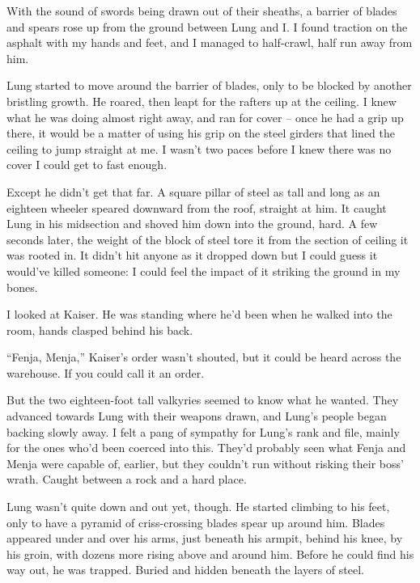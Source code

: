 With the sound of swords being drawn out of their sheaths, a barrier of blades and spears rose up from the ground between Lung and I.  I found traction on the asphalt with my hands and feet, and I managed to half-crawl, half run away from him.



Lung started to move around the barrier of blades, only to be blocked by another bristling growth.  He roared, then leapt for the rafters up at the ceiling.  I knew what he was doing almost right away, and ran for cover – once he had a grip up there, it would be a matter of using his grip on the steel girders that lined the ceiling to jump straight at me.  I wasn't two paces before I knew there was no cover I could get to fast enough.



Except he didn't get that far.  A square pillar of steel  as tall and long as an eighteen wheeler speared downward from the roof, straight at him.  It caught Lung in his midsection and shoved him down into the ground, hard.  A few seconds later, the weight of the block of steel tore it from the section of ceiling it was rooted in.  It didn't hit anyone as it dropped down but I could guess it would've killed someone: I could feel the impact of it striking the ground in my bones.



I looked at Kaiser.  He was standing where he'd been when he walked into the room, hands clasped behind his back.



``Fenja, Menja,'' Kaiser's order wasn't shouted, but it could be heard across the warehouse.  If you could call it an order.



But the two eighteen-foot tall valkyries seemed to know what he wanted.  They advanced towards Lung with their weapons drawn, and Lung's people began backing slowly away.  I felt a pang of sympathy for Lung's rank and file, mainly for the ones who'd been coerced into this.  They'd probably seen what Fenja and Menja were capable of, earlier, but they couldn't run without risking their boss' wrath.  Caught between a rock and a hard place.



Lung wasn't quite down and out yet, though.  He started climbing to his feet, only to have a pyramid of criss-crossing blades spear up around him.  Blades appeared under and over his arms, just beneath his armpit, behind his knee, by his groin, with dozens more rising above and around him. Before he could find his way out, he was trapped.  Buried and hidden beneath the layers of steel.



